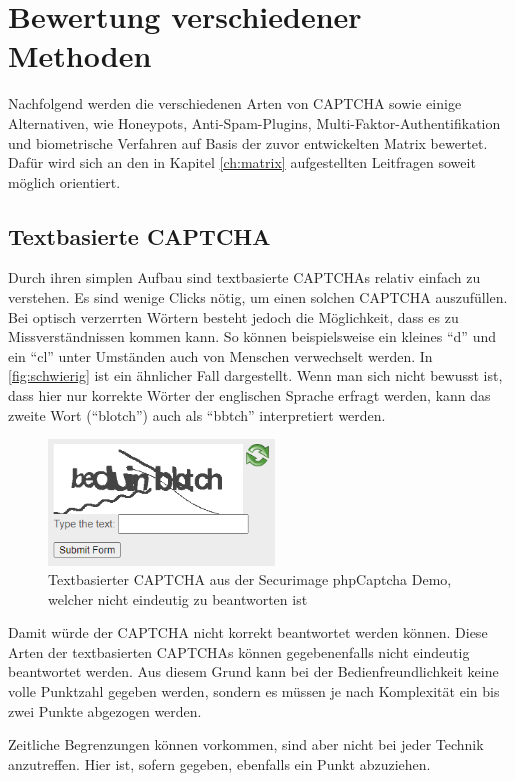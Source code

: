 \chapter{Bewertung verschiedener Methoden}

Nachfolgend werden die verschiedenen Arten von CAPTCHA sowie einige Alternativen, wie Honeypots, Anti-Spam-Plugins, 
Multi-Faktor-Authentifikation und biometrische Verfahren auf Basis der zuvor entwickelten Matrix bewertet. 
Dafür wird sich an den in Kapitel \ref{ch:matrix} aufgestellten Leitfragen soweit möglich orientiert.

\section{Textbasierte CAPTCHA}
Durch ihren simplen Aufbau sind textbasierte CAPTCHAs relativ einfach zu verstehen.
Es sind wenige Clicks nötig, um einen solchen CAPTCHA auszufüllen. 
Bei optisch verzerrten Wörtern besteht jedoch die Möglichkeit, dass es zu Missverständnissen kommen kann.
So können beispielsweise ein kleines ``d'' und ein ``cl'' unter Umständen auch von Menschen verwechselt werden. 
In \autoref{fig:schwierig} ist ein ähnlicher Fall dargestellt. 
Wenn man sich nicht bewusst ist, dass hier nur korrekte Wörter der englischen Sprache erfragt werden,
kann das zweite Wort (``blotch'') auch als ``bbtch'' interpretiert werden.

\begin{figure}[h!]
    \centering
    \includegraphics[width=6cm]{gfx/mygraphics/schwierig4.png}
    \caption{Textbasierter CAPTCHA aus der Securimage phpCaptcha Demo, welcher nicht eindeutig zu beantworten ist}
    \label{fig:schwierig}
\end{figure}

Damit würde der CAPTCHA nicht korrekt beantwortet werden können.
Diese Arten der textbasierten CAPTCHAs können gegebenenfalls nicht eindeutig beantwortet werden.
Aus diesem Grund kann bei der Bedienfreundlichkeit keine volle Punktzahl gegeben werden,
sondern es müssen je nach Komplexität ein bis zwei Punkte abgezogen werden.

Zeitliche Begrenzungen können vorkommen, sind aber nicht bei jeder Technik anzutreffen.
Hier ist, sofern gegeben, ebenfalls ein Punkt abzuziehen.

